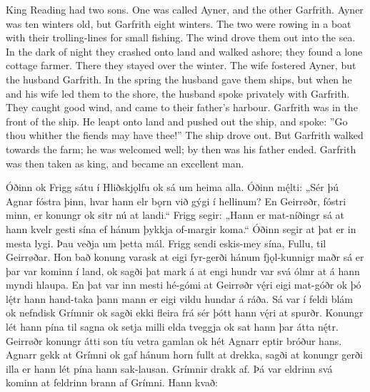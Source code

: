 \bpb King Reading had two sons. One was called Ayner, and the other Garfrith.
Ayner was ten winters old, but Garfrith eight winters. The two were rowing in a boat with their trolling-lines for small fishing.
The wind drove them out into the sea. In the dark of night they crashed onto land and walked ashore; they found a lone cottage farmer.
There they stayed over the winter. The wife fostered Ayner, but the husband Garfrith.
In the spring the husband gave them ships, but when he and his wife led them to the shore, the husband spoke privately with Garfrith.
They caught good wind, and came to their father’s harbour. Garfrith was in the front of the ship.
He leapt onto land and pushed out the ship, and spoke: ”Go thou whither the fiends may have thee!”
The ship drove out. But Garfrith walked towards the farm; he was welcomed well; by then was his father ended.
Garfrith was then taken as king, and became an excellent man.\epb\epg


\bpg\bpa{}%
Óðinn ok Frigg sátu í Hliðskjǫlfu ok sá um heima alla.
Óðinn mę́lti: „Sér þú Agnar fóstra þinn, hvar hann elr bǫrn við gýgi í hellinum?
En Geirrøðr, fóstri minn, er konungr ok sitr nú at landi.“
Frigg segir: „Hann er mat-níðingr sá at hann kvelr gesti sína ef hánum þykkja of-margir koma.“
Óðinn segir at þat er in mesta lygi. Þau veðja um þetta mál.
Frigg sendi eskis-mey sína, Fullu, til Geirrøðar. Hon bað konung varask at eigi fyr-gerði hánum fjǫl-kunnigr maðr sá er þar var kominn í land, ok sagði þat mark á at engi hundr var svá ólmr at á hann myndi hlaupa.
En þat var inn mesti hé-gómi at Geirrøðr vę́ri eigi mat-góðr ok þó lę́tr hann hand-taka þann mann er eigi vildu hundar á ráða.
Sá var í feldi blám ok nefndisk Grímnir ok sagði ekki fleira frá sér þótt hann vę́ri at spurðr.
Konungr lét hann pína til sagna ok setja milli elda tveggja ok sat hann þar átta nę́tr.
Geirrøðr konungr átti son tíu vetra gamlan ok hét Agnarr eptir bróður hans.
Agnarr gekk at Grímni ok gaf hánum horn fullt at drekka, sagði at konungr gerði illa er hann lét pína hann sak-lausan.
Grímnir drakk af. Þá var eldrinn svá kominn at feldrinn brann af Grímni. Hann kvað:\epa


